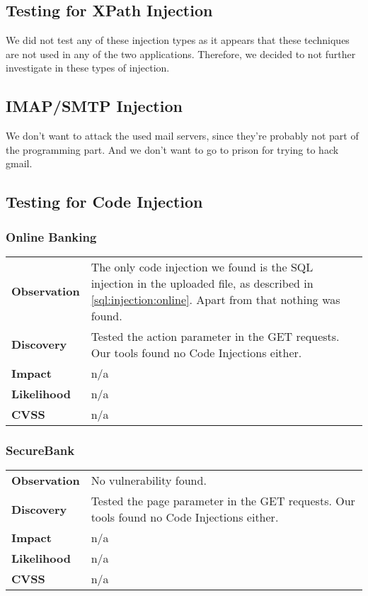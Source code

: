 \subsection{Testing for XPath Injection}
We did not test any of these injection types as it appears that these techniques are not used in any of the two applications. Therefore, we decided to not further investigate in these types of injection.

\subsection{IMAP/SMTP Injection}

We don't want to attack the used mail servers, since they're probably not part of the programming part. And we don't want to go to prison for trying to hack gmail.

\clearpage


\subsection{Testing for Code Injection}

\subsubsection*{Online Banking}

\begin{tabular}{l|p{10cm}}
\textbf{Observation} & The only code injection we found is the SQL injection in the uploaded file, as described in \ref{sql:injection:online}. Apart from that nothing was found.\\
\textbf{Discovery} & Tested the action parameter in the GET requests. Our tools found no Code Injections either.\\
\textbf{Impact} & n/a \\
\textbf{Likelihood} & n/a \\
\textbf{CVSS} & n/a \\
\end{tabular}

\subsubsection*{SecureBank}

\begin{tabular}{l|p{10cm}}
\textbf{Observation} & No vulnerability found.\\
\textbf{Discovery} & Tested the page parameter in the GET requests. Our tools found no Code Injections either.\\
\textbf{Impact} & n/a \\
\textbf{Likelihood} & n/a \\
\textbf{CVSS} & n/a \\
\end{tabular}

